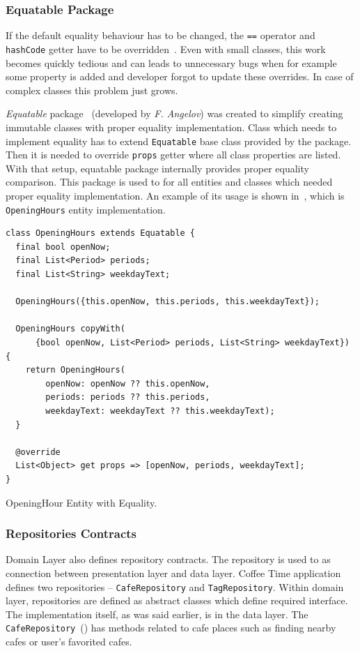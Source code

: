 \subsubsection{Equatable Package}
If the default equality behaviour has to be changed, the \verb|==| operator and \verb|hashCode| getter have to be overridden~\cite{dart-equality}.
Even with small classes, this work becomes quickly tedious and can leads to unnecessary bugs when for example some property is added and developer forgot to update these overrides. In case of complex classes this problem just grows. 

\textit{Equatable} package~\cite{package-equatable} (developed by \textit{F. Angelov}) was created to simplify creating immutable classes with proper equality implementation. Class which needs to implement equality has to extend \verb|Equatable| base class provided by the package. Then it is needed to override \verb|props| getter where all class properties are listed. With that setup, equatable package internally provides proper equality comparison. This package is used to for all entities and classes which needed proper equality implementation. An example of its usage is shown in~, which is \verb|OpeningHours| entity implementation. 

\begin{listing}[ht]
\begin{verbatim}
class OpeningHours extends Equatable {
  final bool openNow;
  final List<Period> periods;
  final List<String> weekdayText;

  OpeningHours({this.openNow, this.periods, this.weekdayText});

  OpeningHours copyWith(
      {bool openNow, List<Period> periods, List<String> weekdayText}) {
    return OpeningHours(
        openNow: openNow ?? this.openNow,
        periods: periods ?? this.periods,
        weekdayText: weekdayText ?? this.weekdayText);
  }

  @override
  List<Object> get props => [openNow, periods, weekdayText];
}
\end{verbatim}
\caption{OpeningHour Entity with Equality.}
\label{listing:ct-opening-hour-entity}
\end{listing}

\subsubsection{Repositories Contracts}
Domain Layer also defines repository contracts. The repository is used to as connection between presentation layer and data layer. Coffee Time application defines two repositories -- \verb|CafeRepository| and \verb|TagRepository|. Within domain layer, repositories are defined as abstract classes which define required interface. The implementation itself, as was said earlier, is in the data layer. The \verb|CafeRepository|~() has methods related to cafe places such as finding nearby cafes or user's favorited cafes. 

